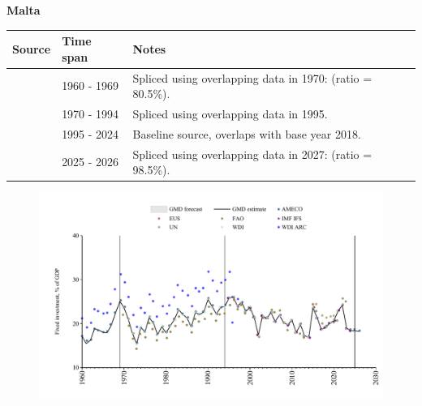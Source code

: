 \documentclass[12pt,a4paper,landscape]{article}
\begin{document}
\begin{adjustbox}{max totalsize={\paperwidth}{\paperheight},center}
\begin{minipage}[t][\textheight][t]{\textwidth}
\vspace*{0.5cm}
{}
\begin{center}
{\Large\bfseries Malta}
\end{center}
\vspace{0.5cm}
\begin{table}[H]
\centering
\small
\begin{tabular}{|l|l|l|}
\hline
\textbf{Source} & \textbf{Time span} & \textbf{Notes} \\
\hline
\rowcolor{white}\cite{WDI_ARC}& 1960 - 1969 &Spliced using overlapping data in 1970: (ratio = 80.5\%).\\
\rowcolor{lightgray}\cite{WDI}& 1970 - 1994 &Spliced using overlapping data in 1995.\\
\rowcolor{white}\cite{EUS}& 1995 - 2024 &Baseline source, overlaps with base year 2018.\\
\rowcolor{lightgray}\cite{AMECO}& 2025 - 2026 &Spliced using overlapping data in 2027: (ratio = 98.5\%).\\
\hline
\end{tabular}
\end{table}
\begin{figure}[H]
\centering
\includegraphics[width=\textwidth,height=0.6\textheight,keepaspectratio]{graphs/MLT_finv_GDP.pdf}
\end{figure}
\end{minipage}
\end{adjustbox}
\end{document}
